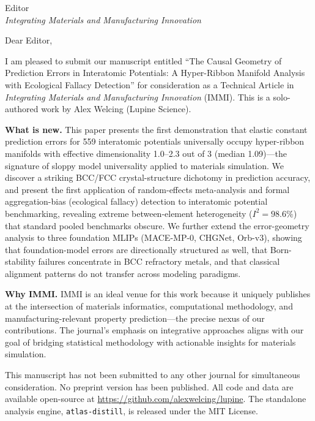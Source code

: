 \documentclass[11pt]{letter}
\begin{document}
\begin{letter}{Editor\\\textit{Integrating Materials and Manufacturing Innovation}}

\opening{Dear Editor,}

I am pleased to submit our manuscript entitled ``The Causal Geometry of Prediction Errors in Interatomic Potentials: A Hyper-Ribbon Manifold Analysis with Ecological Fallacy Detection'' for consideration as a Technical Article in \textit{Integrating Materials and Manufacturing Innovation} (IMMI). This is a solo-authored work by Alex Welcing (Lupine Science).

\textbf{What is new.} This paper presents the first demonstration that elastic constant prediction errors for 559 interatomic potentials universally occupy hyper-ribbon manifolds with effective dimensionality 1.0--2.3 out of 3 (median 1.09)---the signature of sloppy model universality applied to materials simulation. We discover a striking BCC/FCC crystal-structure dichotomy in prediction accuracy, and present the first application of random-effects meta-analysis and formal aggregation-bias (ecological fallacy) detection to interatomic potential benchmarking, revealing extreme between-element heterogeneity ($I^2 = 98.6\%$) that standard pooled benchmarks obscure. We further extend the error-geometry analysis to three foundation MLIPs (MACE-MP-0, CHGNet, Orb-v3), showing that foundation-model errors are directionally structured as well, that Born-stability failures concentrate in BCC refractory metals, and that classical alignment patterns do not transfer across modeling paradigms.

\textbf{Why IMMI.} IMMI is an ideal venue for this work because it uniquely publishes at the intersection of materials informatics, computational methodology, and manufacturing-relevant property prediction---the precise nexus of our contributions. The journal's emphasis on integrative approaches aligns with our goal of bridging statistical methodology with actionable insights for materials simulation.

This manuscript has not been submitted to any other journal for simultaneous consideration. No preprint version has been published. All code and data are available open-source at \url{https://github.com/alexwelcing/lupine}. The standalone analysis engine, \texttt{atlas-distill}, is released under the MIT License.


\end{letter}
\end{document}
